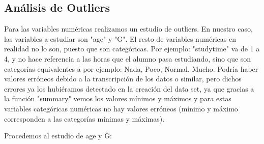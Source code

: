 \documentclass[12pt,a4paper]{article}
\begin{document}
\subsection{Análisis de Outliers}
Para las variables numéricas realizamos un estudio de outliers. En nuestro caso, las variables a estudiar son "age" y "G". El resto de variables numéricas en realidad no lo son, puesto que son categóricas. Por ejemplo: "studytime" va de 1 a 4, y no hace referencia a las horas que el alumno pasa estudiando, sino que son categorías equivalentes a por ejemplo: Nada, Poco, Normal, Mucho. Podría haber valores erróneos debido a la transcripción de los datos o similar, pero dichos errores ya los hubiéramos detectado en la creación del data set, ya que gracias a la función "summary" vemos los valores mínimos y máximos y para estas variables categóricas numéricas no hay valores erróneos (mínimo y máximo corresponden a las categorías mínimas y máximas).

Procedemos al estudio de age y G:
\end{document}
